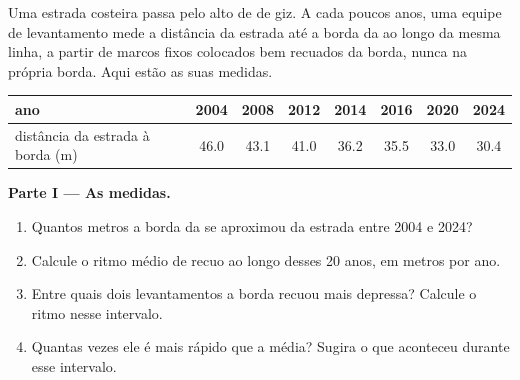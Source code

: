 \begin{problem}
\label{pb:g9:landforms:1}
Uma estrada costeira passa pelo alto de  de giz. A cada poucos
anos, uma equipe de levantamento mede a distância da estrada até a borda
da  ao longo da mesma linha, a partir de marcos fixos colocados bem
recuados da borda, nunca na própria borda. Aqui estão as suas medidas.

\begin{center}
{\small
\begin{tabular}{|l|c|c|c|c|c|c|c|}
\hline
ano & 2004 & 2008 & 2012 & 2014 & 2016 & 2020 & 2024 \\
\hline
distância da estrada à borda (m) & 46.0 & 43.1 & 41.0 & 36.2 & 35.5 & 33.0 & 30.4 \\
\hline
\end{tabular}}
\end{center}

\noindent\textbf{Parte I --- As medidas.}\par\nopagebreak
\begin{enumerate}[beginpenalty=10000]
  \item Quantos metros a borda da  se aproximou da estrada entre
        2004 e 2024?
  \item Calcule o ritmo médio de recuo ao longo desses 20 anos, em metros
        por ano.
  \item Entre quais dois levantamentos a borda recuou mais depressa?
        Calcule o ritmo nesse intervalo.
  \item Quantas vezes ele é mais rápido que a média? Sugira o que
        aconteceu durante esse intervalo.
\end{enumerate}

\begin{omfigure}


\end{omfigure}
\end{problem}
